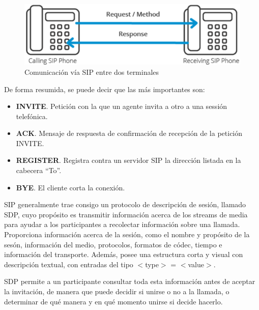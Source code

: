 \documentclass[a4paper, 12pt]{book}
\begin{document}
\begin{figure}[h]
  \centering
  \includegraphics{img/fig_phones}
  \caption{Comunicación vía SIP entre dos terminales}
  \label{figura:fig_phones}
\end{figure}

De forma resumida, se puede decir que las más importantes son:
\begin{itemize}
  \item \textbf{INVITE}. Petición con la que un agente invita a otro a una sessión telefónica.
  \item \textbf{ACK}. Mensaje de respuesta de confirmación de recepción de la petición INVITE.
  \item \textbf{REGISTER}. Registra contra un servidor SIP la dirección listada en la cabecera ``To''.
  \item \textbf{BYE}. El cliente corta la conexión.\\
\end{itemize}

SIP generalmente trae consigo un protocolo de descripción de sesión, llamado SDP, cuyo propósito es transmitir información acerca de los streams de media para ayudar a los participantes a recolectar información sobre una llamada. Proporciona información acerca de la sesión, como el nombre y propósito de la sesón, información del medio, protocolos, formatos de códec, tiempo e información del transporte. Además, posee una estructura corta y visual con descripción textual, con entradas del tipo $<$type$>$ = $<$value$>$.

SDP permite a un participante consultar toda esta información antes de aceptar la invitación, de manera que puede decidir si unirse o no a la llamada, o determinar de qué manera y en qué momento unirse si decide hacerlo.
\end{document}
